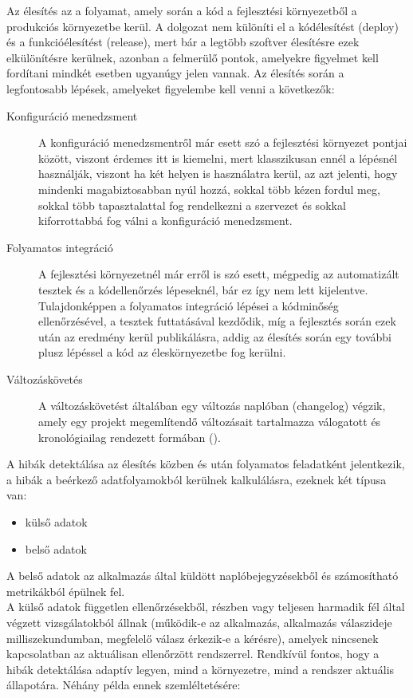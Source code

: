 Az élesítés az a folyamat, amely során a kód a fejlesztési környezetből a produkciós környezetbe kerül. A dolgozat nem különíti el a kódélesítést (deploy) és a funkcióélesítést (release), mert bár a legtöbb szoftver élesítésre ezek elkülönítésre kerülnek, azonban a felmerülő pontok, amelyekre figyelmet kell fordítani mindkét esetben ugyanúgy jelen vannak. Az élesítés során a legfontosabb lépések, amelyeket figyelembe kell venni a következők:
\begin{description}
  \item[Konfiguráció menedzsment]
  A konfiguráció menedzsmentről már esett szó a fejlesztési környezet pontjai között, viszont érdemes itt is kiemelni, mert klasszikusan ennél a lépésnél használják, viszont ha két helyen is használatra kerül, az azt jelenti, hogy mindenki magabiztosabban nyúl hozzá, sokkal több kézen fordul meg, sokkal több tapasztalattal fog rendelkezni a szervezet és sokkal kiforrottabbá fog válni a konfiguráció menedzsment.
  \item[Folyamatos integráció]
  A fejlesztési környezetnél már erről is szó esett, mégpedig az automatizált tesztek és a kódellenőrzés lépeseknél, bár ez így nem lett kijelentve. Tulajdonképpen a folyamatos integráció lépései a kódminőség ellenőrzésével, a tesztek futtatásával kezdődik, míg a fejlesztés során ezek után az eredmény kerül publikálásra, addig az élesítés során egy további plusz lépéssel a kód az éleskörnyezetbe fog kerülni.
  \item[Változáskövetés]
  A változáskövetést általában egy változás naplóban (changelog) végzik, amely egy projekt megemlítendő változásait tartalmazza válogatott és kronológiailag rendezett formában (\cite{keep_a_changelog}).
\end{description}

A hibák detektálása az élesítés közben és után folyamatos feladatként jelentkezik, a hibák a beérkező adatfolyamokból kerülnek kalkulálásra, ezeknek két típusa van:
\begin{itemize}
  \item külső adatok
  \item belső adatok
\end{itemize}

A belső adatok az alkalmazás által küldött naplóbejegyzésekből és számosítható metrikákból épülnek fel.\\
A külső adatok független ellenőrzésekből, részben vagy teljesen harmadik fél által végzett vizsgálatokból állnak (működik-e az alkalmazás, alkalmazás válaszideje milliszekundumban, megfelelő válasz érkezik-e a kérésre), amelyek nincsenek kapcsolatban az aktuálisan ellenőrzött rendszerrel. Rendkívül fontos, hogy a hibák detektálása adaptív legyen, mind a környezetre, mind a rendszer aktuális állapotára. Néhány példa ennek szemléltetésére:

